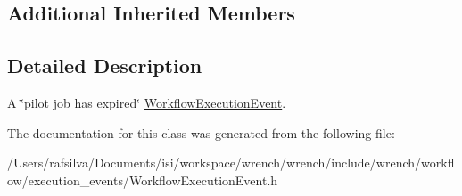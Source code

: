 \subsection*{Additional Inherited Members}


\subsection{Detailed Description}
A \char`\"{}pilot job has expired\char`\"{} \hyperlink{classwrench_1_1_workflow_execution_event}{Workflow\+Execution\+Event}. 

The documentation for this class was generated from the following file\+:\begin{DoxyCompactItemize}
\item 
/\+Users/rafsilva/\+Documents/isi/workspace/wrench/wrench/include/wrench/workflow/execution\+\_\+events/Workflow\+Execution\+Event.\+h\end{DoxyCompactItemize}
